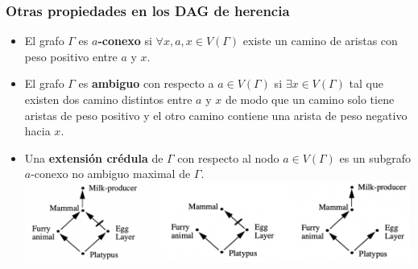 \documentclass[
10pt, %
aspectratio=169, %
]{beamer}
\begin{document}
	\begin{frame}
		
		\frametitle{Otras propiedades en los DAG de herencia}
		
		\begin{itemize}
			\item El grafo $\Gamma$ es \textbf{$a$-conexo} si $\forall x, a, x \in V(\Gamma)$ existe un camino de aristas con peso positivo entre $a$ y $x$.
			
			\vspace{1\baselineskip}
			\item El grafo $\Gamma$ es \textbf{ambiguo} con respecto a $a \in V(\Gamma)$ si $\exists x \in V(\Gamma)$ tal que existen dos camino distintos entre $a$ y $x$ de modo que un camino solo tiene aristas de peso positivo y el otro camino contiene una arista de peso negativo hacia $x$.
			
			\vspace{1\baselineskip}
			\item Una \textbf{extensión crédula} de $\Gamma$ con respecto al nodo $a \in V(\Gamma)$ es un subgrafo $a$-conexo no ambiguo maximal de $\Gamma$. \\[3mm]
			
			\centering
			\includegraphics[scale=0.27]{credula.png}
			
		\end{itemize}
		
	\end{frame}
	
\end{document}

